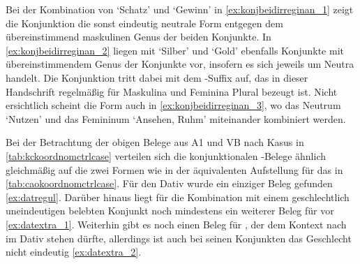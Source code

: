 Bei der Kombination von  `Schatz' und 
`Gewinn' in \cref{ex:konjbeidirreginan_1} zeigt die Konjunktion die sonst
eindeutig neutrale Form entgegen dem übereinstimmend maskulinen Genus der
beiden Konjunkte. In \cref{ex:konjbeidirreginan_2} liegen mit 
`Silber' und  `Gold' ebenfalls Konjunkte mit
übereinstimmendem Genus der Konjunkte vor, insofern es sich jeweils um Neutra
handelt. Die Konjunktion tritt dabei mit dem -Suffix auf, das in dieser
Handschrift regelmäßig für Maskulina und Feminina Plural bezeugt ist. Nicht
ersichtlich scheint die Form  auch in \cref{ex:konjbeidirreginan_3},
wo das Neutrum  `Nutzen' und das Femininum 
`Ansehen, Ruhm' miteinander kombiniert werden.

Bei der Betrachtung der obigen Belege aus A1 und VB nach
Kasus in \cref{tab:kckoordnomctrlcase} verteilen sich die konjunktionalen
-Belege ähnlich gleichmäßig auf die zwei Formen wie in der
äquivalenten Aufstellung für das \CAO{} in
\cref{tab:caokoordnomctrlcase}. Für den Dativ wurde ein einziger Beleg gefunden
\cref{ex:datregul}. Darüber hinaus liegt für die Kombination mit einem
geschlechtlich uneindeutigen belebten Konjunkt noch mindestens ein weiterer
Beleg für  vor \cref{ex:datextra_1}. Weiterhin gibt es noch
einen Beleg für , der dem Kontext nach im Dativ stehen dürfte,
allerdings ist auch bei seinen Konjunkten das Geschlecht nicht eindeutig
\cref{ex:datextra_2}.

